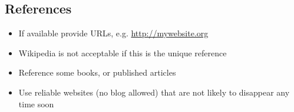 \documentclass{article}
\begin{document}
\subsection*{References}

\begin{itemize}\itemsep .125cm
		\item If available provide URLs, e.g. \url{http://mywebsite.org}
		\item Wikipedia is not acceptable if this is the unique reference
		\item Reference some books, or published articles
		\item Use reliable websites (no blog allowed) that are not likely to disappear any time soon
\end{itemize}

\ifx\onefile\undefined
\end{document}
